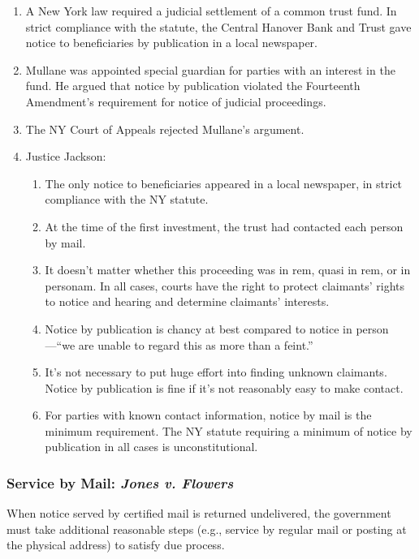 \begin{enumerate}
    \item A New York law required a judicial settlement of a common trust 
    fund. In strict compliance with the statute, the Central Hanover Bank and 
    Trust gave notice to beneficiaries by publication in a local newspaper.  
    \item Mullane was appointed special guardian for parties with an interest 
    in the fund. He argued that notice by publication violated the Fourteenth 
    Amendment's requirement for notice of judicial proceedings.
    \item The NY Court of Appeals rejected Mullane's argument.
    \item Justice Jackson:
    \begin{enumerate}
        \item The only notice to beneficiaries appeared in a local newspaper, 
        in strict compliance with the NY statute.
        \item At the time of the first investment, the trust had contacted 
        each person by mail.
        \item It doesn't matter whether this proceeding was in rem, quasi in 
        rem, or in personam. In all cases, courts have the right to protect 
        claimants' rights to notice and hearing and determine claimants' 
        interests.
        \item Notice by publication is chancy at best compared to notice in 
        person---``we are unable to regard this as more than a feint.''
        \item It's not necessary to put huge effort into finding unknown 
        claimants. Notice by publication is fine if it's not reasonably easy 
        to make contact.
        \item For parties with known contact information, notice by mail is 
        the minimum requirement. The NY statute requiring a minimum of notice 
        by publication in all cases is unconstitutional.
    \end{enumerate}
\end{enumerate}

\subsubsection{Service by Mail: \emph{Jones v. Flowers}}

When notice served by certified mail is returned undelivered, the government 
must take additional reasonable steps (e.g., service by regular mail or 
posting at the physical address) to satisfy due process.

